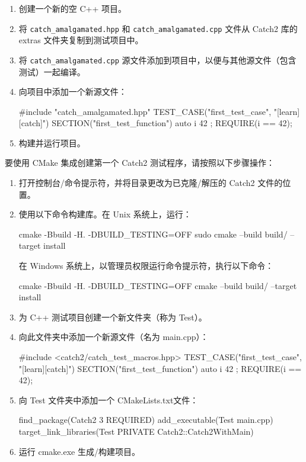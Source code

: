 \begin{enumerate}
\item
创建一个新的空 C++ 项目。

\item
将 \verb|catch_amalgamated.hpp| 和 \verb|catch_amalgamated.cpp| 文件从 Catch2 库的 extras 文件夹复制到测试项目中。

\item
将 \verb|catch_amalgamated.cpp| 源文件添加到项目中，以便与其他源文件（包含测试）一起编译。

\item
向项目中添加一个新源文件：

\begin{cpp}
#include "catch_amalgamated.hpp"
TEST_CASE("first_test_case", "[learn][catch]")
{
    SECTION("first_test_function")
    {
        auto i{ 42 };
        REQUIRE(i == 42);
    }
}
\end{cpp}

\item
构建并运行项目。
\end{enumerate}

要使用 CMake 集成创建第一个 Catch2 测试程序，请按照以下步骤操作：

\begin{enumerate}
\item
打开控制台/命令提示符，并将目录更改为已克隆/解压的 Catch2 文件的位置。

\item
使用以下命令构建库。在 Unix 系统上，运行：

\begin{shell}
cmake -Bbuild -H. -DBUILD_TESTING=OFF
sudo cmake --build build/ --target install
\end{shell}

在 Windows 系统上，以管理员权限运行命令提示符，执行以下命令：

\begin{shell}
cmake -Bbuild -H. -DBUILD_TESTING=OFF
cmake --build build/ --target install
\end{shell}

\item
为 C++ 测试项目创建一个新文件夹（称为 Test）。

\item
向此文件夹中添加一个新源文件（名为 main.cpp）：

\begin{cpp}
#include <catch2/catch_test_macros.hpp>
TEST_CASE("first_test_case", "[learn][catch]")
{
    SECTION("first_test_function")
    {
        auto i{ 42 };
        REQUIRE(i == 42);
    }
}
\end{cpp}

\item
向 Test 文件夹中添加一个 CMakeLists.txt文件：

\begin{cmake}
find_package(Catch2 3 REQUIRED)
add_executable(Test main.cpp)
target_link_libraries(Test PRIVATE Catch2::Catch2WithMain)
\end{cmake}

\item
运行 cmake.exe 生成/构建项目。
\end{enumerate}

